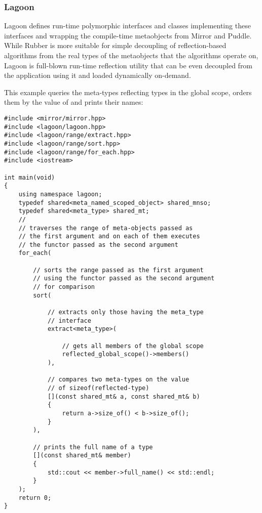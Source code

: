 \subsubsection{Lagoon}

Lagoon defines run-time polymorphic interfaces and classes implementing these
interfaces and wrapping the compile-time metaobjects from Mirror and Puddle.
While Rubber is more suitable for simple decoupling of reflection-based
algorithms from the real types of the metaobjects that the algorithms
operate on, Lagoon is full-blown run-time reflection utility that can be
even decoupled from the application using it and loaded dynamically on-demand.

This example queries the meta-types reflecting types in the global scope,
orders them by the value of \verb@sizeof@ and prints their names:

\begin{verbatim}
#include <mirror/mirror.hpp>
#include <lagoon/lagoon.hpp>
#include <lagoon/range/extract.hpp>
#include <lagoon/range/sort.hpp>
#include <lagoon/range/for_each.hpp>
#include <iostream>

int main(void)
{
    using namespace lagoon;
    typedef shared<meta_named_scoped_object> shared_mnso;
    typedef shared<meta_type> shared_mt;
    //
    // traverses the range of meta-objects passed as
    // the first argument and on each of them executes
    // the functor passed as the second argument
    for_each(

        // sorts the range passed as the first argument
        // using the functor passed as the second argument
        // for comparison
        sort(

            // extracts only those having the meta_type
            // interface
            extract<meta_type>(

                // gets all members of the global scope
                reflected_global_scope()->members()
            ),

            // compares two meta-types on the value
            // of sizeof(reflected-type)
            [](const shared_mt& a, const shared_mt& b)
            {
                return a->size_of() < b->size_of();
            }
        ),

        // prints the full name of a type
        [](const shared_mt& member)
        {
            std::cout << member->full_name() << std::endl;
        }
    );
    return 0;
}
\end{verbatim}


